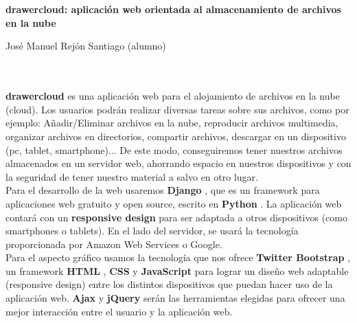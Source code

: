 \chapter*{}




\clearpage
\thispagestyle{empty}

\begin{center}
{\large\bfseries drawercloud: aplicación web orientada al almacenamiento de archivos en la nube}\\
\end{center}
\begin{center}
José Manuel Rejón Santiago (alumno)\\
\end{center}

\\

\vspace{0.5cm}
\\

\textbf{drawercloud} es una aplicación web para el alojamiento de archivos en la nube (cloud). Los usuarios podrán realizar diversas tareas sobre sus archivos, como por ejemplo: Añadir/Eliminar archivos en la nube, reproducir archivos multimedia, organizar archivos en directorios, compartir archivos, descargar en un dispositivo (pc, tablet, smartphone)... De este modo, conseguiremos tener nuestros archivos almacenados en un servidor web, ahorrando espacio en nuestros dispositivos y con la seguridad de tener nuestro material a salvo en otro lugar.\\

Para el desarrollo de la web usaremos \textbf{Django} \cite{cita1}, que es un framework para aplicaciones web gratuito y open source, escrito en \textbf{Python} \cite{cita2}. La aplicación web contará con un \textbf{responsive design} para ser adaptada a otros dispositivos (como smartphones o tablets). En el lado del servidor, se usará la tecnología proporcionada por Amazon Web Services o Google.\\

Para el aspecto gráfico usamos la tecnología que nos ofrece \textbf{Twitter Bootstrap} \cite{cita3}, un framework \textbf{HTML} \cite{cita4}, \textbf{CSS} \cite{cita5} y \textbf{JavaScript} \cite{cita6} para lograr un diseño web adaptable (responsive design) entre los distintos dispositivos que puedan hacer uso de la aplicación web. \textbf{Ajax} \cite{cita7} y \textbf{jQuery} \cite{cita8} serán las herramientas elegidas para ofrecer una mejor interacción entre el usuario y la aplicación web. \\

